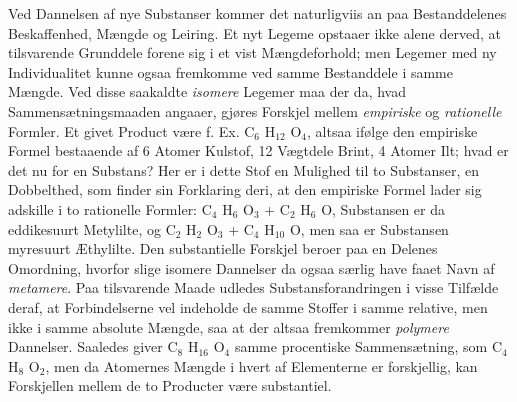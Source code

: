 \documentclass[12pt,a4paper]{book}
\begin{document}
Ved Dannelsen af nye Substanser kommer det naturligviis an paa
Bestanddelenes Beskaffenhed, Mængde og Leiring. Et nyt Legeme opstaaer
ikke alene derved, at tilsvarende Grunddele forene sig i et vist
Mængdeforhold; men Legemer med ny Individualitet kunne ogsaa
fremkomme ved samme Bestanddele i samme Mængde. Ved disse saakaldte
\emph{isomere} Legemer maa der da, hvad Sammensætningsmaaden angaaer,
gjøres Forskjel mellem \emph{empiriske} og \emph{rationelle} Formler.
Et givet Product være f. Ex. C$_6$ H$_{12}$ O$_4$, altsaa ifølge den
empiriske Formel bestaaende af 6 Atomer Kulstof, 12 Vægtdele Brint, 4
Atomer Ilt; hvad er det nu for en Substans? Her er i dette Stof en
Mulighed til to Substanser, en Dobbelthed, som finder sin Forklaring
deri, at den empiriske Formel lader sig adskille i to rationelle
Formler: C$_4$ H$_6$ O$_3$ + C$_2$ H$_6$ O, Substansen er da
eddikesuurt Metylilte, og C$_2$ H$_2$ O$_3$ + C$_4$ H$_{10}$ O, men
saa er Substansen myresuurt Æthylilte. Den substantielle Forskjel
beroer paa en Delenes Omordning, hvorfor slige isomere Dannelser da
ogsaa særlig have faaet Navn af \emph{metamere}. Paa tilsvarende Maade
udledes Substansforandringen i visse Tilfælde deraf, at
Forbindelserne vel indeholde de samme Stoffer i samme relative, men
ikke i samme absolute Mængde, saa at der altsaa fremkommer
\emph{polymere} Dannelser. Saaledes giver C$_8$ H$_{16}$ O$_4$ samme
procentiske Sammensætning, som C$_4$ H$_8$ O$_2$, men da Atomernes
Mængde i hvert af Elementerne er forskjellig, kan Forskjellen mellem
de to Producter være substantiel.
\end{document}
